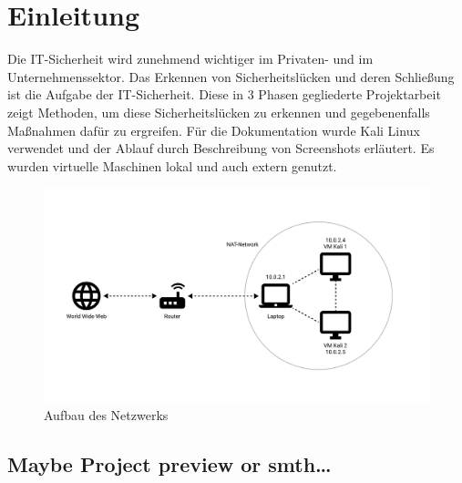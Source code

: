 \chapter{Einleitung}
Die IT-Sicherheit wird zunehmend wichtiger im Privaten- und im Unternehmenssektor. Das Erkennen von Sicherheitslücken und deren Schließung ist die Aufgabe der IT-Sicherheit. Diese in 3 Phasen gegliederte Projektarbeit zeigt Methoden, um diese Sicherheitslücken zu erkennen und gegebenenfalls Maßnahmen dafür zu ergreifen. Für die Dokumentation wurde Kali Linux verwendet und der Ablauf durch Beschreibung von Screenshots erläutert. Es wurden virtuelle Maschinen lokal und auch extern genutzt.
\begin{figure}
    \includegraphics[width=\linewidth]{img/network_fig.png}
    \caption{Aufbau des Netzwerks}
    \label{fig:network}
\end{figure}
\section*{Maybe Project preview or smth…}
